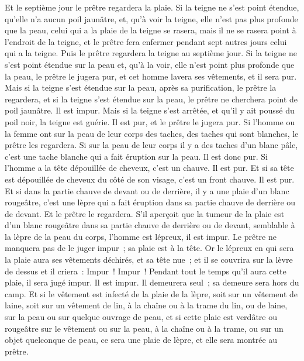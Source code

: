 \begin{multicols}{2}
Et le septième jour le prêtre regardera la plaie. Si la teigne ne s'est point étendue, qu'elle n'a aucun poil jaunâtre, et, qu'à voir la teigne, elle n'est pas plus profonde que la peau,
celui qui a la plaie de la teigne se rasera, mais il ne se rasera point à l'endroit de la teigne, et le prêtre fera enfermer pendant sept autres jours celui qui a la teigne.
Puis le prêtre regardera la teigne au septième jour. Si la teigne ne s'est point étendue sur la peau et, qu'à la voir, elle n'est point plus profonde que la peau, le prêtre le jugera pur, et cet homme lavera ses vêtements, et il sera pur.
Mais si la teigne s'est étendue sur la peau, après sa purification, le prêtre la regardera,
et si la teigne s'est étendue sur la peau, le prêtre ne cherchera point de poil jaunâtre. Il est impur.
Mais si la teigne s'est arrêtée, et qu'il y ait poussé du poil noir, la teigne est guérie. Il est pur, et le prêtre le jugera pur.
Si l'homme ou la femme ont sur la peau de leur corps des taches, des taches qui sont blanches,
le prêtre les regardera. Si sur la peau de leur corps il y a des taches d'un blanc pâle, c'est une tache blanche qui a fait éruption sur la peau. Il est donc pur.
Si l'homme a la tête dépouillée de cheveux, c'est un chauve. Il est pur.
Et si sa tête est dépouillée de cheveux du côté de son visage, c'est un front chauve. Il est pur.
Et si dans la partie chauve de devant ou de derrière, il y a une plaie d'un blanc rougeâtre, c'est une lèpre qui a fait éruption dans sa partie chauve de derrière ou de devant.
Et le prêtre le regardera. S'il aperçoit que la tumeur de la plaie est d'un blanc rougeâtre dans sa partie chauve de derrière ou de devant, semblable à la lèpre de la peau du corps,
l'homme est lépreux, il est impur. Le prêtre ne manquera pas de le juger impur~; sa plaie est à la tête.
Or le lépreux en qui sera la plaie aura ses vêtements déchirés, et sa tête nue~; et il se couvrira sur la lèvre de dessus et il criera~: Impur~! Impur~!
Pendant tout le temps qu'il aura cette plaie, il sera jugé impur. Il est impur. Il demeurera seul~; sa demeure sera hors du camp.
Et si le vêtement est infecté de la plaie de la lèpre, soit sur un vêtement de laine, soit sur un vêtement de lin,
à la chaîne ou à la trame du lin, ou de laine, sur la peau ou sur quelque ouvrage de peau,
et si cette plaie est verdâtre ou rougeâtre sur le vêtement ou sur la peau, à la chaîne ou à la trame, ou sur un objet quelconque de peau, ce sera une plaie de lèpre, et elle sera montrée au prêtre.

\end{multicols}
